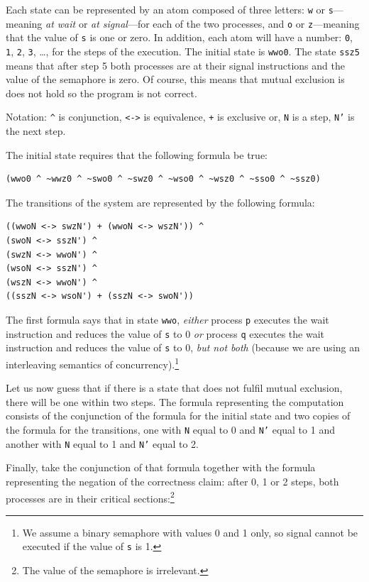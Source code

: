 \documentclass[11pt]{report}
\newcommand*{\p}[1]{\textup{\texttt{#1}}}
\begin{document}
Each state can be represented by an atom composed of three letters:
\p{w} or \p{s}---meaning \emph{at wait} or \emph{at signal}---for each
of the two processes, and \p{o} or \p{z}---meaning that the value of
\p{s} is one or zero. In addition, each atom will have a number: \p{0},
\p{1}, \p{2}, \p{3}, \ldots, for the steps of the execution. The initial
state is \p{wwo0}. The state \p{ssz5} means that after step 5 both
processes are at their signal instructions and the value of the
semaphore is zero. Of course, this means that mutual exclusion is does
not hold so the program is not correct.

Notation: \verb=^= is conjunction, \verb=<->= is equivalence, \verb=+= is
exclusive or, \p{N} is a step, \p{N'} is the next step.

The initial state requires that the following formula be true:
\begin{verbatim}
(wwo0 ^ ~wwz0 ^ ~swo0 ^ ~swz0 ^ ~wso0 ^ ~wsz0 ^ ~sso0 ^ ~ssz0)
\end{verbatim}

The transitions of the system are represented by the following formula:
\begin{verbatim}
((wwoN <-> swzN') + (wwoN <-> wszN')) ^
(swoN <-> sszN') ^
(swzN <-> wwoN') ^
(wsoN <-> sszN') ^
(wszN <-> wwoN') ^
((sszN <-> wsoN') + (sszN <-> swoN'))
\end{verbatim}

The first formula says that in state \p{wwo}, \emph{either} process
\p{p} executes the wait instruction and reduces the value of \p{s} to 0
\emph{or} process \p{q} executes the wait instruction and reduces the
value of \p{s} to 0, \emph{but not both} (because we are using an
interleaving semantics of concurrency).\footnote{We assume a binary
semaphore with values 0 and 1 only, so signal cannot be executed if
the value of \p{s} is 1.}

Let us now guess that if there is a state that does not fulfil mutual
exclusion, there will be one within two steps. The formula representing
the computation consists of the conjunction of the formula for the
initial state and two copies of the formula for the transitions, one
with \p{N} equal to 0 and \p{N'} equal to 1 and another with \p{N} equal
to 1 and \p{N'} equal to 2.

Finally, take the conjunction of that formula together with the formula
representing the negation of the correctness claim: after 0, 1 or 2
steps, both processes are in their critical sections:\footnote{The value
of the semaphore is irrelevant.}
\end{document}
